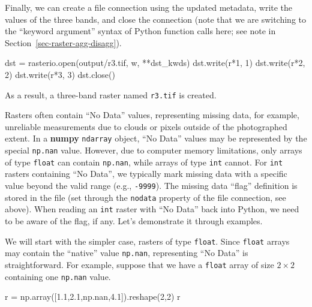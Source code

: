 \documentclass[
  letterpaper,
]{krantz}
\newenvironment{Shaded}{\begin{snugshade}}{\end{snugshade}}
\newcommand{\BuiltInTok}[1]{\textcolor[rgb]{0.00,0.23,0.31}{#1}}
\newcommand{\DecValTok}[1]{\textcolor[rgb]{0.68,0.00,0.00}{#1}}
\newcommand{\FloatTok}[1]{\textcolor[rgb]{0.68,0.00,0.00}{#1}}
\newcommand{\NormalTok}[1]{\textcolor[rgb]{0.00,0.23,0.31}{#1}}
\newcommand{\OperatorTok}[1]{\textcolor[rgb]{0.37,0.37,0.37}{#1}}
\newcommand{\StringTok}[1]{\textcolor[rgb]{0.13,0.47,0.30}{#1}}
\begin{document}
Finally, we can create a file connection using the updated metadata,
write the values of the three bands, and close the connection (note that
we are switching to the ``keyword argument'' syntax of Python function
calls here; see note in Section~\ref{sec-raster-agg-disagg}).

\begin{Shaded}
\begin{Highlighting}[]
\NormalTok{dst }\OperatorTok{=}\NormalTok{ rasterio.}\BuiltInTok{open}\NormalTok{(}\StringTok{\textquotesingle{}output/r3.tif\textquotesingle{}}\NormalTok{, }\StringTok{\textquotesingle{}w\textquotesingle{}}\NormalTok{, }\OperatorTok{**}\NormalTok{dst\_kwds)}
\NormalTok{dst.write(r}\OperatorTok{*}\DecValTok{1}\NormalTok{, }\DecValTok{1}\NormalTok{)}
\NormalTok{dst.write(r}\OperatorTok{*}\DecValTok{2}\NormalTok{, }\DecValTok{2}\NormalTok{)}
\NormalTok{dst.write(r}\OperatorTok{*}\DecValTok{3}\NormalTok{, }\DecValTok{3}\NormalTok{)}
\NormalTok{dst.close()}
\end{Highlighting}
\end{Shaded}

As a result, a three-band raster named \texttt{r3.tif} is created.

Rasters often contain ``No Data'' values, representing missing data, for
example, unreliable measurements due to clouds or pixels outside of the
photographed extent. In a \textbf{numpy} \texttt{ndarray} object, ``No
Data'' values may be represented by the special \texttt{np.nan} value.
However, due to computer memory limitations, only arrays of type
\texttt{float} can contain \texttt{np.nan}, while arrays of type
\texttt{int} cannot. For \texttt{int} rasters containing ``No Data'', we
typically mark missing data with a specific value beyond the valid range
(e.g., \texttt{-9999}). The missing data ``flag'' definition is stored
in the file (set through the \texttt{nodata} property of the file
connection, see above). When reading an \texttt{int} raster with ``No
Data'' back into Python, we need to be aware of the flag, if any. Let's
demonstrate it through examples.

We will start with the simpler case, rasters of type \texttt{float}.
Since \texttt{float} arrays may contain the ``native'' value
\texttt{np.nan}, representing ``No Data'' is straightforward. For
example, suppose that we have a \texttt{float} array of size
\(2 \times 2\) containing one \texttt{np.nan} value.

\begin{Shaded}
\begin{Highlighting}[]
\NormalTok{r }\OperatorTok{=}\NormalTok{ np.array([}\FloatTok{1.1}\NormalTok{,}\FloatTok{2.1}\NormalTok{,np.nan,}\FloatTok{4.1}\NormalTok{]).reshape(}\DecValTok{2}\NormalTok{,}\DecValTok{2}\NormalTok{)}
\NormalTok{r}
\end{Highlighting}
\end{Shaded}
\end{document}
